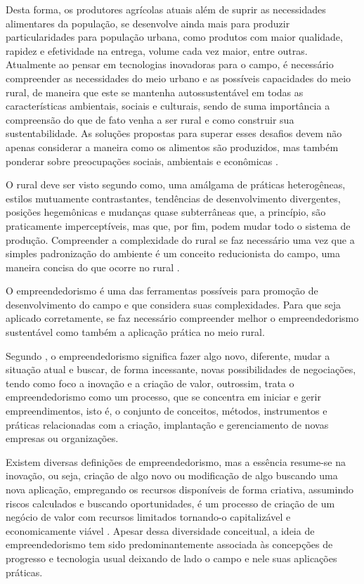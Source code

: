 Desta forma, os produtores agrícolas atuais além de suprir as necessidades alimentares da população, se desenvolve ainda mais para produzir particularidades para população urbana, como produtos com maior qualidade, rapidez e efetividade na entrega, volume cada vez maior, entre outras. Atualmente ao pensar em tecnologias inovadoras para o campo, é necessário compreender as necessidades do meio urbano e as possíveis capacidades do meio rural, de maneira que este se mantenha autossustentável em todas as características ambientais, sociais e culturais, sendo de suma importância a compreensão do que de fato venha a ser rural e como construir sua sustentabilidade. As soluções propostas para superar esses desafios devem não apenas considerar a maneira como os alimentos são produzidos, mas também ponderar sobre preocupações sociais, ambientais e econômicas \cite{kamble_achieving_2020}. 

O rural deve ser visto segundo \cite{kageyama_desenvolvimento_2008} como, uma amálgama de práticas heterogêneas, estilos mutuamente contrastantes, tendências de desenvolvimento divergentes, posições hegemônicas e mudanças quase subterrâneas que, a princípio, são praticamente imperceptíveis, mas que, por fim, podem mudar todo o sistema de produção. Compreender a complexidade do rural se faz necessário uma vez que a simples padronização do ambiente é um conceito reducionista do campo, uma maneira concisa do que ocorre no rural \cite{van_der_ploeg_trajetorias_2011}. 

O empreendedorismo é uma das ferramentas possíveis para promoção de desenvolvimento do campo e que considera suas complexidades. Para que seja aplicado corretamente, se faz necessário compreender melhor o empreendedorismo sustentável como também a aplicação prática no meio rural. 

Segundo , o empreendedorismo significa fazer algo novo, diferente, mudar a situação atual e buscar, de forma incessante, novas possibilidades de negociações, tendo como foco a inovação e a criação de valor, outrossim,  trata o empreendedorismo como  um  processo,  que se concentra em iniciar  e  gerir  empreendimentos,  isto  é,  o conjunto  de  conceitos,  métodos,  instrumentos  e  práticas  relacionadas  com  a criação, implantação  e  gerenciamento de novas  empresas  ou organizações.

Existem diversas definições de empreendedorismo, mas a essência resume-se na inovação, ou seja, criação de algo novo ou modificação de algo buscando uma nova aplicação, empregando os recursos disponíveis de forma criativa, assumindo riscos calculados e buscando oportunidades, é um processo de criação de um negócio de valor com recursos limitados tornando-o capitalizável e economicamente viável \cite{costa_empreendedorismo_2006, stevenson_new_1989, lopes_educacao_2010}. Apesar dessa diversidade conceitual, a ideia de empreendedorismo tem sido predominantemente associada às concepções de progresso e tecnologia usual deixando de lado o campo e nele suas aplicações práticas.  


